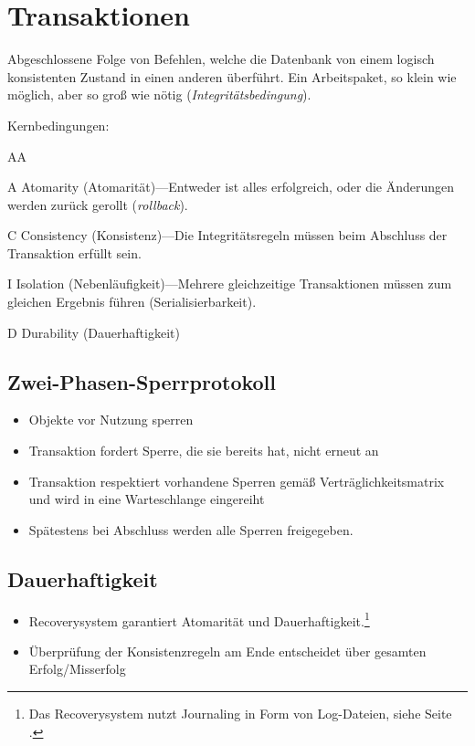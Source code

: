 \section{Transaktionen}

Abgeschlossene Folge von Befehlen, welche die Datenbank von einem
logisch konsistenten Zustand in einen anderen überführt. Ein Arbeitspaket,
so klein wie möglich, aber so groß wie nötig (\emph{Integritätsbedingung}).

Kernbedingungen:
\begin{labeling}{AA}
  \item [{A}] \foreignlanguage{english}{Atomarity} (Atomarität)---Entweder ist alles erfolgreich,
	      oder die Änderungen werden zurück gerollt (\foreignlanguage{english}{\emph{rollback}}).
  \item [{C}] \foreignlanguage{english}{Consistency} (Konsistenz)---Die Integritätsregeln müssen beim Abschluss der Transaktion erfüllt sein.
  \item [{I}] \foreignlanguage{english}{Isolation} (Nebenläufigkeit)---Mehrere gleichzeitige Transaktionen müssen zum gleichen
	      Ergebnis führen (Serialisierbarkeit).
  \item [{D}] \foreignlanguage{english}{Durability} (Dauerhaftigkeit)
\end{labeling}

\subsection{Zwei-Phasen-Sperrprotokoll}
\begin{itemize}
  \item Objekte vor Nutzung sperren
  \item Transaktion fordert Sperre, die sie bereits hat, nicht erneut an
  \item Transaktion respektiert vorhandene Sperren gemäß Verträglichkeitsmatrix und wird in eine Warteschlange eingereiht
  \item Spätestens bei Abschluss werden alle Sperren freigegeben.
\end{itemize}


\subsection{Dauerhaftigkeit}
\begin{itemize}
	\item Recoverysystem garantiert Atomarität und Dauerhaftigkeit.\footnote{%
		Das Recoverysystem nutzt Journaling in Form von Log-Dateien, siehe
		Seite \pageref{sub:Journaling}.%
	}
	\item Überprüfung der Konsistenzregeln am Ende entscheidet über gesamten
		Erfolg/Misserfolg
\end{itemize}

